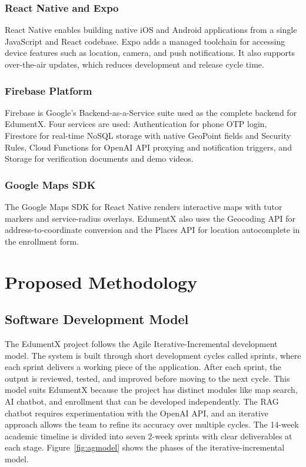 \documentclass[12pt]{report}
\begin{document}
\subsection{React Native and Expo}

React Native enables building native iOS and Android applications from a single JavaScript and React codebase. Expo adds a managed toolchain for accessing device features such as location, camera, and push notifications. It also supports over-the-air updates, which reduces development and release cycle time.

\subsection{Firebase Platform}

Firebase is Google's Backend-as-a-Service suite used as the complete backend for EdumentX. Four services are used: Authentication for phone OTP login, Firestore for real-time NoSQL storage with native GeoPoint fields and Security Rules, Cloud Functions for OpenAI API proxying and notification triggers, and Storage for verification documents and demo videos.

\subsection{Google Maps SDK}

The Google Maps SDK for React Native renders interactive maps with tutor markers and service-radius overlays. EdumentX also uses the Geocoding API for address-to-coordinate conversion and the Places API for location autocomplete in the enrollment form.

\chapter{Proposed Methodology}

\section{Software Development Model}

The EdumentX project follows the Agile Iterative-Incremental development model. The system is built through short development cycles called sprints, where each sprint delivers a working piece of the application. After each sprint, the output is reviewed, tested, and improved before moving to the next cycle. This model suits EdumentX because the project has distinct modules like map search, AI chatbot, and enrollment that can be developed independently. The RAG chatbot requires experimentation with the OpenAI API, and an iterative approach allows the team to refine its accuracy over multiple cycles. The 14-week academic timeline is divided into seven 2-week sprints with clear deliverables at each stage. Figure~\ref{fig:agmodel} shows the phases of the iterative-incremental model.
\end{document}
